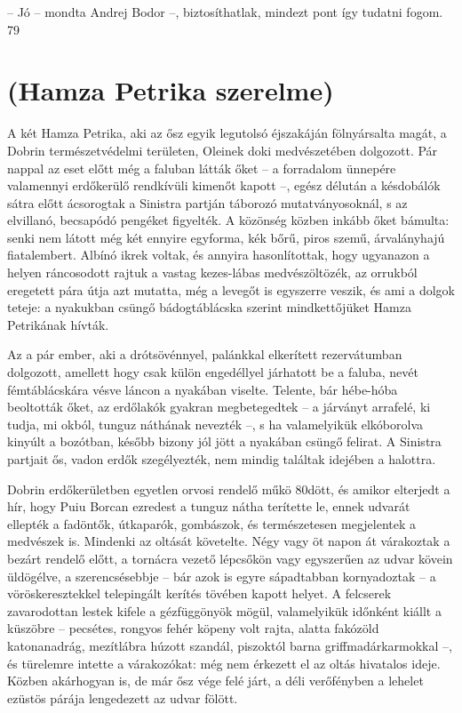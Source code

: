 \documentclass{IEEEtran}
\begin{document}
– Jó – mondta Andrej Bodor –, biztosíthatlak, mindezt pont így tudatni fogom.
79
\section{(Hamza Petrika szerelme)}

A két Hamza Petrika, aki az ősz egyik legutolsó éjszakáján fölnyársalta magát,
a Dobrin természetvédelmi területen, Oleinek doki medvészetében dolgozott. Pár
nappal az eset előtt még a faluban látták őket – a forradalom ünnepére
valamennyi erdőkerülő rendkívüli kimenőt kapott –, egész délután a késdobálók
sátra előtt ácsorogtak a Sinistra partján táborozó mutatványosoknál, s az
elvillanó, becsapódó pengéket figyelték. A közönség közben inkább őket
bámulta: senki nem látott még két ennyire egyforma, kék bőrű, piros szemű,
árvalányhajú fiatalembert. Albínó ikrek voltak, és annyira hasonlítottak, hogy
ugyanazon a helyen ráncosodott rajtuk a vastag kezes-lábas medvészöltözék, az
orrukból eregetett pára útja azt mutatta, még a levegőt is egyszerre veszik,
és ami a dolgok teteje: a nyakukban csüngő bádogtáblácska szerint
mindkettőjüket Hamza Petrikának hívták.

Az a pár ember, aki a drótsövénnyel, palánkkal elkerített rezervátumban
dolgozott, amellett hogy csak külön engedéllyel járhatott be a faluba, nevét
fémtáblácskára vésve láncon a nyakában viselte. Telente, bár hébe-hóba
beoltották őket, az erdőlakók gyakran megbetegedtek – a járványt arrafelé, ki
tudja, mi okból, tunguz náthának nevezték –, s ha valamelyikük elkóborolva
kinyúlt a bozótban, később bizony jól jött a nyakában csüngő felirat. A
Sinistra partjait ős, vadon erdők szegélyezték, nem mindig találtak idejében a
halottra.

Dobrin erdőkerületben egyetlen orvosi rendelő műkö 80dött, és amikor elterjedt
a hír, hogy Puiu Borcan ezredest a tunguz nátha terítette le, ennek udvarát
ellepték a fadöntők, útkaparók, gombászok, és természetesen megjelentek a
medvészek is. Mindenki az oltását követelte. Négy vagy öt napon át várakoztak
a bezárt rendelő előtt, a tornácra vezető lépcsőkön vagy egyszerűen az udvar
kövein üldögélve, a szerencsésebbje – bár azok is egyre sápadtabban
kornyadoztak – a vöröskeresztekkel telepingált kerítés tövében kapott helyet.
A felcserek zavarodottan lestek kifele a gézfüggönyök mögül, valamelyikük
időnként kiállt a küszöbre – pecsétes, rongyos fehér köpeny volt rajta, alatta
fakózöld katonanadrág, mezítlábra húzott szandál, piszoktól barna
griffmadárkarmokkal –, és türelemre intette a várakozókat: még nem érkezett el
az oltás hivatalos ideje. Közben akárhogyan is, de már ősz vége felé járt, a
déli verőfényben a lehelet ezüstös párája lengedezett az udvar fölött.
\end{document}
